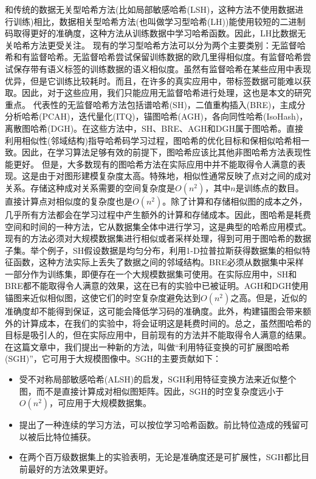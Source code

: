 \documentclass{article}
\begin{document}
和传统的数据无关型哈希方法(比如局部敏感哈希(LSH)\cite{Gionis:1999:SSH:645925.671516,Datar:2004:LHS:997817.997857}，这种方法不使用数据进行训练)相比，数据相关型哈希方法(也叫做学习型哈希(LH))能使用较短的二进制码取得更好的准确度，这种方法从训练数据中学习哈希函数\cite{PMID:24136430,6247912,Zhang2014SHL,NIPS2014_5332}。因此，LH比数据无关哈希方法更受关注\cite{icml2010_WangKC10,PMID:24136430,6247912,Zhang2014SHL,6909650,NIPS2014_5332}。
现有的学习型哈希方法可以分为两个主要类别\cite{PMID:24136430,6247912,Zhang2014SHL}：无监督哈希和有监督哈希。无监督哈希尝试保留训练数据的欧几里得相似度。有监督哈希\cite{ICML2011Norouzi_246,Zhang2014SHL,6909650}尝试保存带有语义标签的训练数据的语义相似度。虽然有监督哈希在某些应用中表现优异，但是它训练比较耗时。而且，在许多的真实应用中，带标签数据可能难以获取。因此，对于这些应用，我们只能应用无监督哈希进行处理，这也是本文的研究重点。
代表性的无监督哈希方法包括谱哈希(SH)\cite{NIPS2008_3383}，二值重构插入(BRE)\cite{Kulis2010Learning}，主成分分析哈希(PCAH)\cite{PMID:24136430}，迭代量化(ITQ)\cite{PMID:24136430}，锚图哈希(AGH)\cite{Liu2011Hashing}，各向同性哈希(IsoHash)\cite{W2012Isotropic}，离散图哈希(DGH)\cite{NIPS2014_5332}。在这些方法中，SH、BRE、AGH和DGH属于图哈希。直接利用相似性(邻域结构)指导哈希码学习过程，图哈希的优化目标和保相似哈希相一致。因此，在学习算法足够有效的前提下，图哈希应该比其他非图哈希方法表现性能更好。
但是，大多数现有的图哈希方法在实际应用中并不能取得令人满意的表现。这是由于对图形建模复杂度太高。特殊地，相似性通常反映了点对之间的成对关系。存储这种成对关系需要的空间复杂度是$O(n^2)$，其中$n$是训练点的数目。直接计算点对相似度的复杂度也是$O(n^2)$。除了计算和存储相似图的成本之外，几乎所有方法都会在学习过程中产生额外的计算和存储成本。因此，图哈希是耗费空间和时间的一种方法，它从数据集全体中进行学习，这是典型的哈希应用模式。现有的方法必须对大规模数据集进行相似或者采样处理，得到可用于图哈希的数据子集。举个例子，SH假设数据是均匀分布，利用1-D拉普拉斯获得数据集的相似特征函数，这种方法实际上丢失了数据之间的邻域结构。BRE必须从数据集中采样一部分作为训练集，即便存在一个大规模数据集可使用。在实际应用中，SH和BRE都不能取得令人满意的效果，这在已有的实验中已被证明\cite{Liu2011Hashing}。AGH和DGH使用锚图来近似相似图，这使它们的时空复杂度避免达到$O(n^2)$之高。但是，近似的准确度却不能得到保证，这可能会降低学习码的准确度。此外，构建锚图会带来额外的计算成本，在我们的实验中，将会证明这是耗费时间的。总之，虽然图哈希的目标是吸引人的，但在实际应用中，目前现有的方法并不能取得令人满意的结果。
在这篇文章中，我们提出一种新的方法，叫做“利用特征变换的可扩展图哈希(SGH)”，它可用于大规模图像中。SGH的主要贡献如下：

\begin{itemize}
\item  受不对称局部敏感哈希(ALSH)\cite{NIPS2014_5329}的启发，SGH利用特征变换方法来近似整个图，而不是直接计算成对相似图矩阵。因此，SGH的时空复杂度远小于$O(n^2)$，可应用于大规模数据集。
\item 提出了一种连续的学习方法，可以按位学习哈希函数。前比特位造成的残留可以被后比特位捕获。
 \item 在两个百万级数据集上的实验表明，无论是准确度还是可扩展性，SGH都比目前最好的方法效果更好。
\end{itemize}
\end{document}
